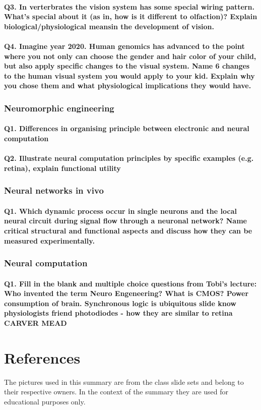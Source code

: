 \documentclass[12pt,article,oneside,a4paper]{memoir}
\begin{document}
\paragraph{Q3. In verterbrates the vision system has some special wiring pattern.
What's special about it (as in, how is it different to olfaction)? Explain biological/physiological meansin the development of vision.}
\paragraph{Q4. Imagine year 2020. Human genomics has advanced to the point where you
not only can choose the gender and hair color of your child, but also apply specific
changes to the visual system. Name 6 changes to the human visual system you would apply to your kid. Explain why you chose them and what physiological implications they would have.}

\subsubsection{Neuromorphic engineering}

\paragraph{Q1. Differences in organising principle between electronic and neural computation}
\paragraph{Q2. Illustrate neural computation principles by specific examples (e.g. retina), explain functional utility}

\subsubsection{Neural networks in vivo}
\paragraph{Q1. Which dynamic process occur in single neurons and the local neural circuit during signal flow through a neuronal network? Name critical structural and functional aspects and discuss how they can be measured experimentally.}

\subsubsection{Neural computation}
\paragraph{Q1. Fill in the blank and multiple choice questions from Tobi's lecture: Who invented the term Neuro Engeneering? What is CMOS? Power consumption of brain. Synchronous logic is ubiquitous slide know physiologists friend photodiodes - how they are similar to retina CARVER MEAD}

\newpage

\section{References}
The pictures used in this summary are from the class slide sets and belong to their respective owners. In the context of the summary they are
used for educational purposes only.
\end{document}
